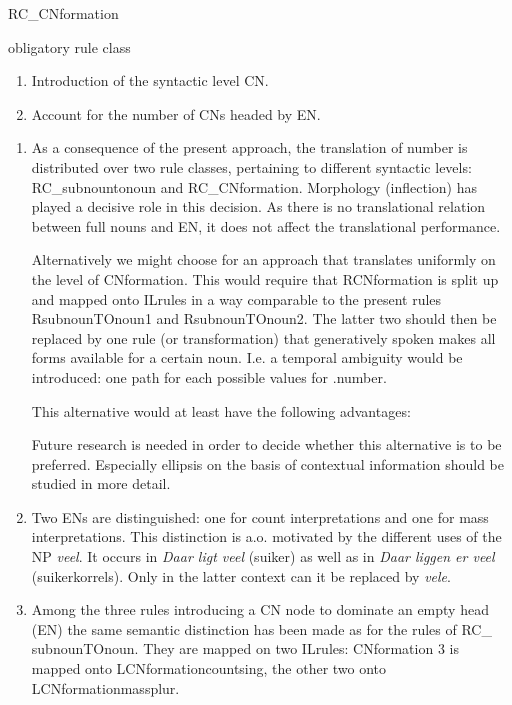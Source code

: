 \begin{mruleclass}{RC\_CNformation}
\begin{classdescr}
\kind obligatory rule class
\classtask
 \begin{enumerate}
  \item 
Introduction of  the syntactic level CN.
  \item
Account for the number of CNs headed by EN.
\end{enumerate}

\classremarks\mbox{}
\begin{enumerate}
  \item 

As a consequence of the present approach, the translation of 
number is distributed over two rule classes, pertaining to different
syntactic levels: RC\_subnountonoun and RC\_CNformation.
Morphology (inflection) has played a decisive role
in this decision. As
 there is no translational relation between full nouns and EN, 
it does not
affect the translational performance.

Alternatively we might choose for an approach that translates uniformly on the
level of CNformation. This would require that RCNformation is split up and 
mapped onto ILrules in a way comparable to the present rules RsubnounTOnoun1 
and RsubnounTOnoun2. The latter two should then be replaced by one rule
(or transformation) that generatively spoken makes all 
forms available for 
a certain noun. I.e. 
a temporal ambiguity would be introduced: one path for
each possible values for .number.

This alternative would at least have the following advantages: \mbox{}
Future research is needed in order to decide whether this alternative is 
to be preferred. Especially ellipsis on the basis of contextual information
should be studied in more detail.
 
 \item Two ENs are distinguished: one for count interpretations and one for 
mass interpretations. This distinction is a.o. motivated by the different
uses of the NP {\em veel}.
It occurs in {\em Daar ligt veel} (suiker) as well as in 
{\em Daar liggen er veel} (suikerkorrels).
Only in the latter context can it be replaced by {\em vele}. 
  \item
Among the three rules introducing a CN node to dominate an empty head (EN) 
the same semantic distinction has been made as for the rules of RC\_
subnounTOnoun.
They are mapped on two ILrules: 
CNformation 3 is mapped onto LCNformationcountsing, the other two
onto 
LCNformationmassplur.


\end{enumerate}
\end{classdescr}
\end{mruleclass}
